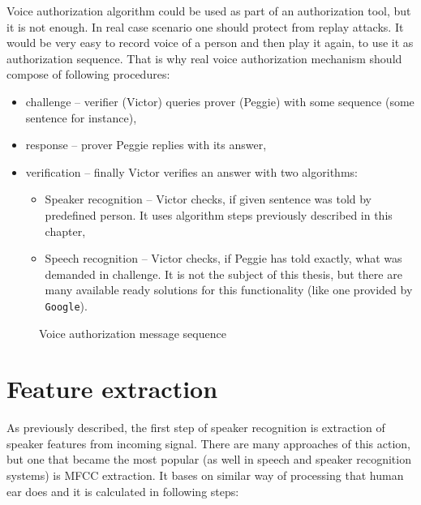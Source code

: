 \documentclass[magister]{dyplom}
\begin{document}
	Voice authorization algorithm could be used as part of an authorization tool, but it is not enough. In real case scenario one should protect from replay attacks. It would be very easy to record voice of a person and then play it again, to use it as authorization sequence. That is why real voice authorization mechanism should compose of following procedures:
	
	\begin{itemize}
		\item challenge -- verifier (Victor) queries prover (Peggie) with some sequence (some sentence for instance),
		\item response -- prover Peggie replies with its answer,
		\item verification -- finally Victor verifies an answer with two algorithms:
		\begin{itemize}
			\item Speaker recognition -- Victor checks, if given sentence was told by predefined person. It uses algorithm steps previously described in this chapter,
			\item Speech recognition -- Victor checks, if Peggie has told exactly, what was demanded in challenge. It is not the subject of this thesis, but there are many available ready solutions for this functionality (like one provided by \texttt{Google}).
		\end{itemize}		
	\end{itemize}	
	
	\begin{figure}[!th]
		\centering	
		\begin{sequencediagram}
			
			
		\end{sequencediagram}	
		\caption{Voice authorization message sequence}
		\label{fig:voice_authorization}
	\end{figure}
	
	\section{Feature extraction} \label{sec:feature_extraction}	
	
	As previously described, the first step of speaker recognition is extraction of speaker features from incoming signal. There are many approaches of this action, but one that became the most popular (as well in speech and speaker recognition systems) is \gls{MFCC} extraction. It bases on similar way of processing that human ear does and it is calculated in following steps:
	
\end{document}
